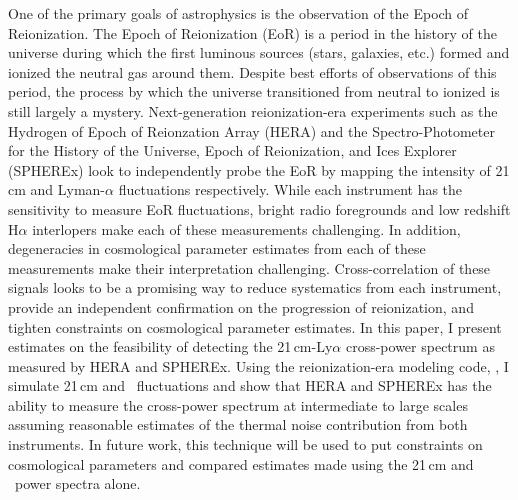One of the primary goals of astrophysics is the observation of the Epoch of Reionization.
The Epoch of Reionization (EoR) is a period in the history of the universe during
which the first luminous sources (stars, galaxies, etc.) formed and ionized the neutral gas around them.
Despite best efforts of observations of this period, the process by which the universe
transitioned from neutral to ionized is still largely a mystery. Next-generation reionization-era
experiments such as the Hydrogen of Epoch of Reionzation Array (HERA) and the Spectro-Photometer
for the History of the Universe, Epoch of Reionization, and Ices Explorer (SPHEREx)
look to independently probe the EoR by mapping the intensity of 21\,cm and Lyman-$\alpha$
fluctuations respectively. While each instrument has the sensitivity to measure
EoR fluctuations, bright radio foregrounds and low redshift H$\alpha$
interlopers make each of these measurements challenging. In addition, degeneracies
in cosmological parameter estimates from each of these measurements make their
interpretation challenging.  Cross-correlation of these signals looks to be a promising way to reduce
systematics from each instrument, provide an independent confirmation
on the progression of reionization, and tighten constraints on cosmological parameter
estimates. In this paper, I present estimates on the feasibility of detecting the 21\,cm-Ly$\alpha$
cross-power spectrum as measured by HERA and SPHEREx. Using the reionization-era modeling
code, \fastsim, I simulate 21\,cm and \lya\ fluctuations and show that HERA and SPHEREx has
the ability to measure the cross-power spectrum at intermediate to large scales assuming reasonable
estimates of the thermal noise contribution from both instruments. In future work,
this technique will be used to put constraints on cosmological parameters and compared
estimates made using the 21\,cm and \lya\ power spectra alone.

\newpage
